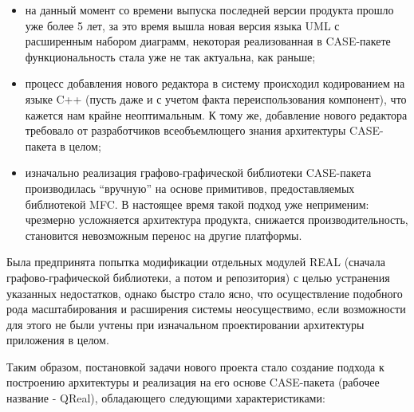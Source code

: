 \documentclass[a5paper]{article}
\begin{document}
\begin{itemize}
  \item на данный момент со времени выпуска последней версии продукта прошло уже
        более 5 лет, за это время вышла новая версия языка
        UML с расширенным набором диаграмм, некоторая реализованная в
        CASE-пакете функциональность стала уже не так актуальна, как раньше;
  \item процесс добавления нового редактора в систему происходил кодированием на
        языке C++ (пусть даже и с учетом факта
        переиспользования компонент), что кажется нам крайне неоптимальным. К
        тому же, добавление нового редактора требовало от разработчиков
        всеобъемлющего знания архитектуры CASE-пакета в целом;
  \item изначально реализация графово-графической библиотеки
        CASE-пакета производилась ``вручную'' на
        основе примитивов, предоставляемых библиотекой
        MFC. В настоящее время такой подход уже
        неприменим: чрезмерно усложняется архитектура продукта, снижается
        производительность, становится невозможным перенос на другие
        платформы.
\end{itemize}

Была предпринята попытка модификации отдельных модулей
REAL (сначала графово-графической библиотеки, а потом и репозитория) с целью устранения указанных
недостатков, однако быстро стало ясно, что осуществление подобного рода
масштабирования и расширения системы неосуществимо, если возможности
для этого не были учтены при изначальном проектировании архитектуры
приложения в целом.

Таким образом, постановкой задачи нового проекта стало создание подхода
к построению архитектуры и реализация на его основе
CASE-пакета (рабочее название - QReal), обладающего следующими характеристиками:
\end{document}
